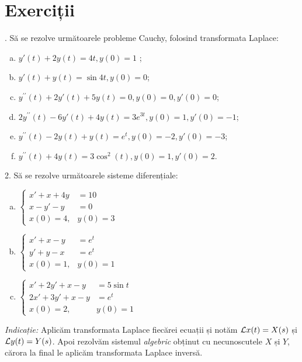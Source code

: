 \vspace{1cm}


\section*{Exerciții}

\indent{}. Să se rezolve următoarele probleme Cauchy, folosind transformata
Laplace:
\begin{enumerate}[(a)]
\item $ y'(t) + 2y(t) = 4t, y(0) = 1 $ ;
\item $ y'(t) + y(t) = \sin 4t, y(0) = 0 $;
\item $ y^{\prime\prime}(t) + 2y'(t) + 5y(t) = 0, y(0) = 0, y'(0) = 0 $;
\item $ 2y^{\prime\prime}(t) - 6y'(t) + 4y(t) = 3e^{3t}, y(0) = 1, y'(0) = -1 $;
\item $ y^{\prime\prime}(t) - 2y(t) + y(t) = e^t, y(0) = -2, y'(0) = -3 $;
\item $ y^{\prime\prime}(t) + 4y(t) = 3\cos^2(t), y(0) = 1, y'(0) = 2 $.  
\end{enumerate}


\vspace{1cm}

2. Să se rezolve următoarele sisteme diferențiale:
\begin{enumerate}[(a)]
\item $
  \begin{cases}
    x' + x + 4y &= 10 \\
    x - y' - y &= 0 \\
    x(0) = 4, & y(0) = 3
  \end{cases}
  $
\item $
  \begin{cases}
    x' + x - y &= e^t \\
    y' + y - x &= e^t \\
    x(0) = 1, & y(0) = 1
  \end{cases}
  $
\item $
  \begin{cases}
    x' + 2y' + x - y &= 5 \sin t \\
    2x' + 3y' + x - y &= e^t \\
    x(0) = 2, & y(0) = 1
  \end{cases}
  $
\end{enumerate}

\emph{Indicație:} Aplicăm transformata Laplace fiecărei ecuații
și notăm $ \mathcal{L} x(t) = X(s) $ și $ \mathcal{L} y(t) = Y(s) $. Apoi rezolvăm sistemul
\emph{algebric} obținut cu necunoscutele $ X $ și $ Y $, cărora la final le
aplicăm transformata Laplace inversă.




